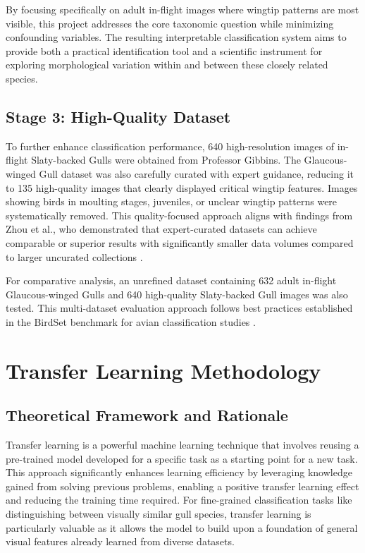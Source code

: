 By focusing specifically on adult in-flight images where wingtip patterns are most visible, this project addresses the core taxonomic question while minimizing confounding variables. The resulting interpretable classification system aims to provide both a practical identification tool and a scientific instrument for exploring morphological variation within and between these closely related species.

\subsection{Stage 3: High-Quality Dataset}

To further enhance classification performance, 640 high-resolution images of in-flight Slaty-backed Gulls were obtained from Professor Gibbins. The Glaucous-winged Gull dataset was also carefully curated with expert guidance, reducing it to 135 high-quality images that clearly displayed critical wingtip features. Images showing birds in moulting stages, juveniles, or unclear wingtip patterns were systematically removed. This quality-focused approach aligns with findings from Zhou et al., who demonstrated that expert-curated datasets can achieve comparable or superior results with significantly smaller data volumes compared to larger uncurated collections \citep{zhou2022}.

For comparative analysis, an unrefined dataset containing 632 adult in-flight Glaucous-winged Gulls and 640 high-quality Slaty-backed Gull images was also tested. This multi-dataset evaluation approach follows best practices established in the BirdSet benchmark for avian classification studies \citep{birdset2023}.

\section{Transfer Learning Methodology}

\subsection{Theoretical Framework and Rationale}

Transfer learning is a powerful machine learning technique that involves reusing a pre-trained model developed for a specific task as a starting point for a new task. This approach significantly enhances learning efficiency by leveraging knowledge gained from solving previous problems, enabling a positive transfer learning effect and reducing the training time required. For fine-grained classification tasks like distinguishing between visually similar gull species, transfer learning is particularly valuable as it allows the model to build upon a foundation of general visual features already learned from diverse datasets.

